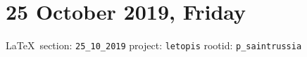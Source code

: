  
 
\section{25 October 2019, Friday}
  
\vspace{0.5cm}
 {\ifDEBUG\small\LaTeX~section: \verb|25_10_2019| project: \verb|letopis| rootid: \verb|p_saintrussia| \fi}
\vspace{0.5cm}

  
